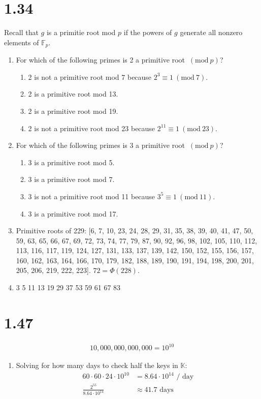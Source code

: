 \documentclass{article}
\newcommand{\Mod}[1]{\ (\mathrm{mod}\ #1)}
\begin{document}
\section*{1.34}
Recall that $g$ is a primitie root mod $p$ if the powers of $g$ generate all nonzero elements of $\mathbb{F}_p$.
\begin{enumerate}[label=(\alph*)]
    \item For which of the following primes is 2 a primitive root $\Mod p$?
          \begin{enumerate}[label=(\roman*)]
              \item 2 is not a primitive root mod 7 because $2^3 \equiv 1 \Mod{7}$.
              \item 2 is a primitive root mod 13.
              \item 2 is a primitive root mod 19.
              \item 2 is not a primitive root mod 23 because $2^{11} \equiv 1 \Mod{23}$.
          \end{enumerate}
    \item For which of the following primes is 3 a primitive root $\Mod p$?
          \begin{enumerate}[label=(\roman*)]
              \item 3 is a primitive root mod 5.
              \item 3 is a primitive root mod 7.
              \item 3 is not a primitive root mod 11 because $3^5 \equiv 1 \Mod{11}$.
              \item 3 is a primitive root mod 17.
          \end{enumerate}
          \addtocounter{enumi}{2}
    \item Primitive roots of 229: [6, 7, 10, 23, 24, 28, 29, 31, 35, 38, 39, 40, 41, 47, 50, 59, 63, 65, 66, 67, 69, 72, 73, 74, 77, 79, 87, 90, 92, 96, 98, 102, 105, 110, 112, 113, 116, 117, 119, 124, 127, 131, 133, 137, 139, 142, 150, 152, 155, 156, 157, 160, 162, 163, 164, 166, 170, 179, 182, 188, 189, 190, 191, 194, 198, 200, 201, 205, 206, 219, 222, 223].
          $72 = \Phi(228).$
    \item 3 5 11 13 19 29 37 53 59 61 67 83
\end{enumerate}

\section*{1.47}
\begin{align*}
    10,000,000,000,000 = 10^{10}
\end{align*}
\begin{enumerate}[label=(\alph*)]
    \item Solving for how many days to check half the keys in $\mathbb{K}$:
          \begin{align*}
              60 \cdot 60 \cdot 24 \cdot 10^{10} & = 8.64 \cdot 10^{14} \text{ / day} \\
              \frac{2^{55}}{8.64\cdot10^{14}}    & \approx 41.7 \text{ days}
          \end{align*}
\end{enumerate}
\end{document}

